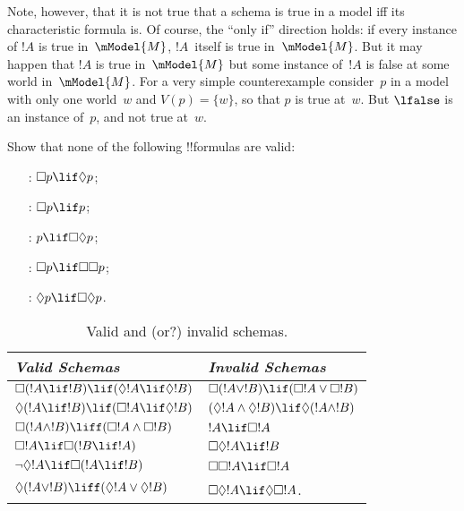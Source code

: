 \documentclass[../../../include/open-logic-section]{subfiles}
\begin{document}
Note, however, that it is not true that a schema is true in a model
iff its characteristic formula is. Of course, the ``only if''
direction holds: if every instance of $!A$ is true in~$\mModel{M}$,
$!A$~itself is true in~$\mModel{M}$. But it may happen that $!A$ is
true in~$\mModel{M}$ but some instance of~$!A$ is false at some world
in~$\mModel{M}$. For a very simple counterexample consider~$p$ in a
model with only one world~$w$ and $V(p) = \{w\}$, so that $p$ is true
at~$w$. But $\lfalse$ is an instance of~$p$, and not true at~$w$.

\begin{prob}
  Show that none of the following !!{formula}s are valid:
  \begin{enumerate}
    \item[\Ax{D}:] \quad $\Box p \lif \Diamond p$;
    \item[\Ax{T}:] \quad $\Box p \lif p$;
    \item[\Ax{B}:] \quad $p \lif \Box\Diamond p$;
    \item[\Ax{4}:] \quad $\Box p \lif \Box \Box p$;
    \item[\Ax{5}:] \quad $\Diamond p \lif \Box \Diamond
      p$.
  \end{enumerate}
\end{prob}

\begin{table}[t]
    \centering
    \begin{tabular}{| l || l |}
      \hline
      {\emph{Valid Schemas}} & {\emph{Invalid Schemas}} \\
      \hline\hline
      $\Box(!A \lif !B) \lif (\Diamond !A \lif \Diamond !B)$
      & $\Box (!A \lor !B) \lif (\Box !A \lor \Box !B)$ \\
      $\Diamond (!A \lif !B) \lif (\Box !A \lif \Diamond
      !B)$ 
      & $(\Diamond !A \land \Diamond !B) \lif \Diamond (!A
      \land !B)$\\
      $\Box (!A \land !B) \liff (\Box !A \land \Box !B)$
      & $!A \lif \Box !A$ \\
      $\Box !A \lif \Box (!B \lif !A)$ 
      & $\Box \Diamond !A \lif !B$ \\
      $\lnot \Diamond !A \lif \Box (!A \lif !B)$
      & $\Box \Box !A \lif \Box !A$ \\
      $\Diamond (!A \lor !B) \liff (\Diamond !A \lor
      \Diamond !B)$
      & $\Box \Diamond !A \lif \Diamond \Box !A$. \\
      \hline
    \end{tabular}
    \caption{Valid and (or?) invalid schemas.}
\end{table}
\end{document}
